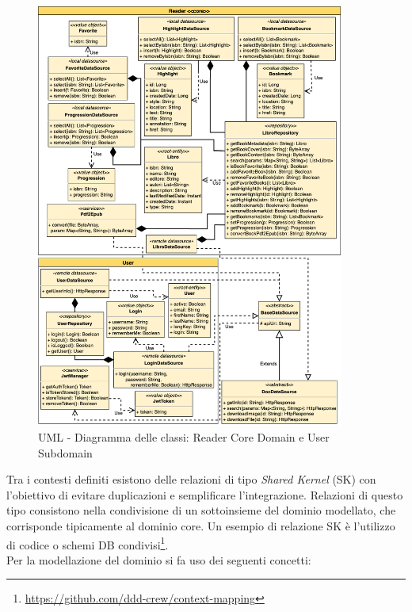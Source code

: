 \begin{figure}[H]
\centering
\includegraphics[width=0.9\textwidth]{img/tesi-25-ddd.drawio.png}
\caption{UML - Diagramma delle classi: Reader Core Domain e User Subdomain}
\label{fig:5.4}
\end{figure}
Tra i contesti definiti esistono delle relazioni di tipo \textit{Shared Kernel}\cite{evans_domain-driven_2004} (SK) con l'obiettivo di evitare duplicazioni e semplificare l'integrazione. Relazioni di questo tipo consistono nella condivisione di un sottoinsieme del dominio modellato, che corrisponde tipicamente al dominio core. Un esempio di relazione SK è l'utilizzo di codice o schemi DB condivisi\footnote{\url{https://github.com/ddd-crew/context-mapping}}.\\
Per la modellazione del dominio si fa uso dei seguenti concetti\cite{evans_domain-driven_2004}:
